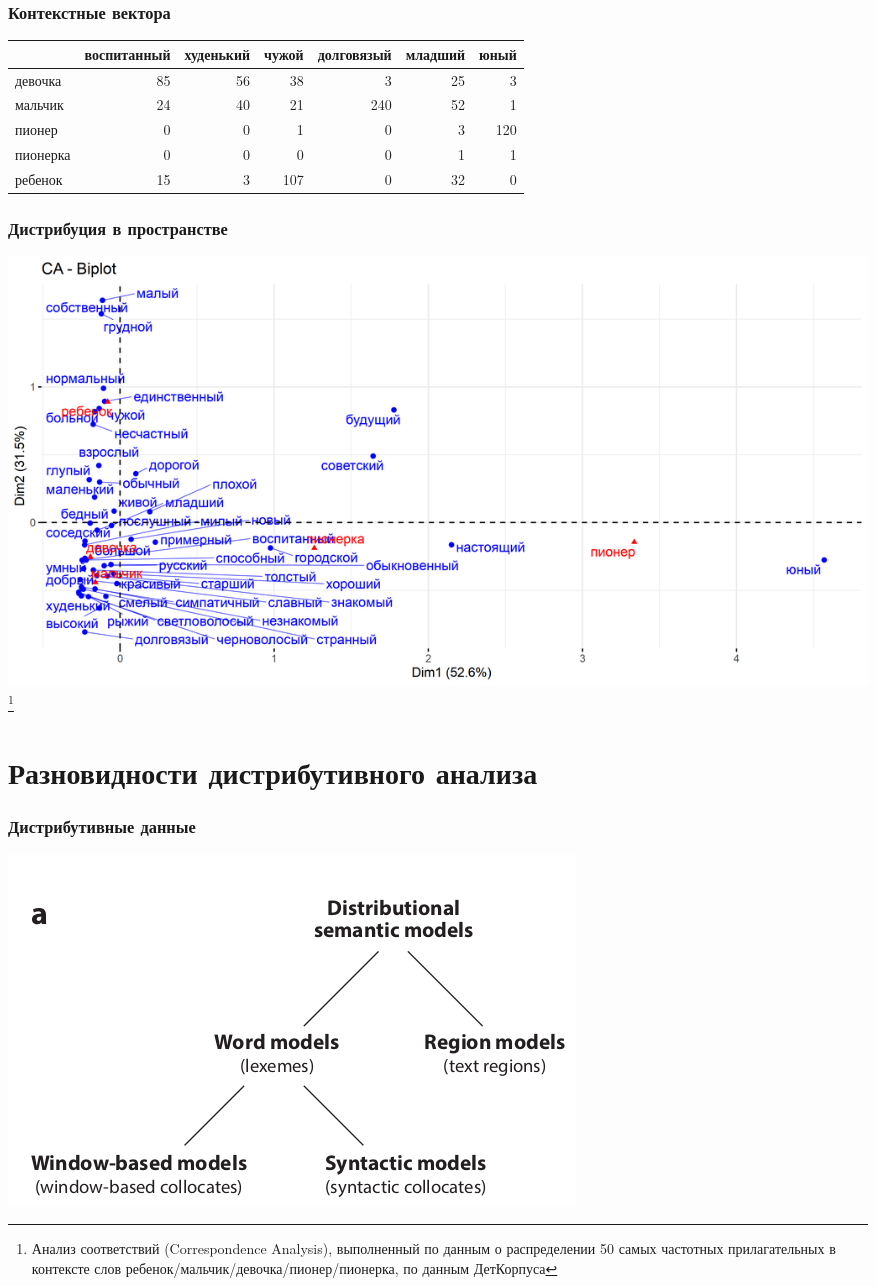 \documentclass[svgnames]{beamer}
\begin{document}
\begin{frame}
  \frametitle{Контекстные вектора}
  \footnotesize
  \begin{tabular}[t]{lrrrrrr}
\toprule
  & воспитанный & худенький & чужой & долговязый & младший & юный\\
\midrule
девочка & 85 & 56 & 38 & 3 & 25 & 3\\
мальчик & 24 & 40 & 21 & 240 & 52 & 1\\
пионер & 0 & 0 & 1 & 0 & 3 & 120\\
пионерка & 0 & 0 & 0 & 0 & 1 & 1\\
ребенок & 15 & 3 & 107 & 0 & 32 & 0\\
\bottomrule
\end{tabular}
\end{frame}

\begin{frame}
  \frametitle{Дистрибуция в пространстве}
  \includegraphics[width=\textwidth]{deti.png}\footnote{Анализ
    соответствий (Correspondence Analysis), выполненный по данным о
    распределении 50 самых частотных прилагательных в контексте слов
    ребенок/мальчик/девочка/пионер/пионерка, по данным ДетКорпуса}
\end{frame}

\section{Разновидности дистрибутивного анализа}

\begin{frame}
  \frametitle{Дистрибутивные данные}
  \includegraphics[width=\textwidth]{dsm-types}
\end{frame}
\end{document}
